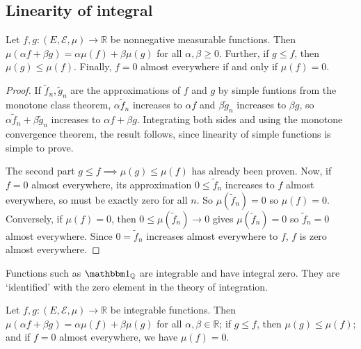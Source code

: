 \subsection{Linearity of integral}
\begin{theorem}
	Let \( f, g \colon (E, \mathcal E, \mu) \to \mathbb R \) be nonnegative measurable functions.
	Then \( \mu(\alpha f + \beta g) = \alpha \mu(f) + \beta \mu(g) \) for all \( \alpha, \beta \geq 0 \).
	Further, if \( g \leq f \), then \( \mu(g) \leq \mu(f) \).
	Finally, \( f = 0 \) almost everywhere if and only if \( \mu(f) = 0 \).
\end{theorem}
\begin{proof}
	If \( \widetilde f_n, \widetilde g_n \) are the approximations of \( f \) and \( g \) by simple funtions from the monotone class theorem, \( \alpha \widetilde f_n \) increases to \( \alpha f \) and \( \beta \widetilde g_n \) increases to \( \beta g \), so \( \alpha \widetilde f_n + \beta \widetilde g_n \) increases to \( \alpha f + \beta g \).
	Integrating both sides and using the monotone convergence theorem, the result follows, since linearity of simple functions is simple to prove.

	The second part \( g \leq f \implies \mu(g) \leq \mu(f) \) has already been proven.
	Now, if \( f = 0 \) almost everywhere, its approximation \( 0 \leq \widetilde f_n \) increases to \( f \) almost everywhere, so must be exactly zero for all \( n \).
	So \( \mu(\widetilde f_n) = 0 \) so \( \mu(f) = 0 \).
	Conversely, if \( \mu(f) = 0 \), then \( 0 \leq \mu(\widetilde f_n) \to 0 \) gives \( \mu(\widetilde f_n) = 0 \) so \( \widetilde f_n = 0 \) almost everywhere.
	Since \( 0 = \widetilde f_n \) increases almost everywhere to \( f \), \( f \) is zero almost everywhere.
\end{proof}
\begin{remark}
	Functions such as \( \mathbbm 1_{\mathbb Q} \) are integrable and have integral zero.
	They are `identified' with the zero element in the theory of integration.
\end{remark}
\begin{theorem}
	Let \( f, g \colon (E, \mathcal E, \mu) \to \mathbb R \) be integrable functions.
	Then \( \mu(\alpha f + \beta g) = \alpha \mu(f) + \beta \mu(g) \) for all \( \alpha, \beta \in \mathbb R \); if \( g \leq f \), then \( \mu(g) \leq \mu(f) \); and if \( f = 0 \) almost everywhere, we have \( \mu(f) = 0 \).
\end{theorem}
